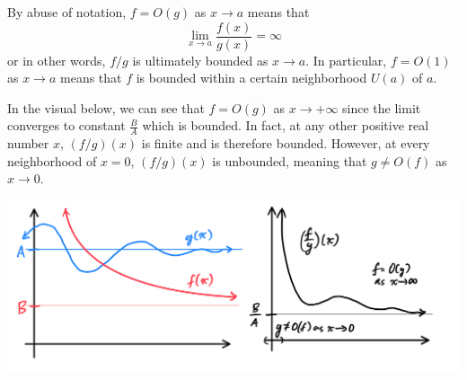 \documentclass{article}
\begin{document}
    \begin{definition}
      By abuse of notation, $f = O(g)$ as $x \rightarrow a$ means that 
      \[\lim_{x \rightarrow a} \frac{f(x)}{g(x)} = \infty\]
      or in other words, $f/g$ is ultimately bounded as $x \rightarrow a$. In particular, $f = O(1)$ as $x \rightarrow a$ means that $f$ is bounded within a certain neighborhood $U(a)$ of $a$. 

      In the visual below, we can see that $f=O(g)$ as $x \rightarrow +\infty$ since the limit converges to constant $\frac{B}{A}$ which is bounded. In fact, at any other positive real number $x$, $(f/g)(x)$ is finite and is therefore bounded. However, at every neighborhood of $x = 0$, $(f/g)(x)$ is unbounded, meaning that $g \neq O(f)$ as $x \rightarrow 0$. 
      \begin{center}
          \includegraphics[scale=0.25]{img/Big_O_Functions.PNG}
      \end{center}
    \end{definition}
\end{document}
